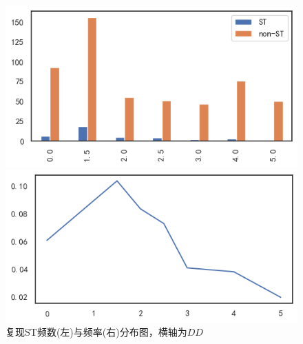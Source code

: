 \documentclass{ctexbeamer}
\begin{document}
\begin{frame}
{\begin{figure}[H]
            \begin{minipage}{0.48\linewidth}
                \includegraphics[width=\linewidth]{img/fig2_.png}
            \end{minipage}
            \begin{minipage}{0.48\linewidth}
                \includegraphics[width=\linewidth]{img/fig3_.png}
            \end{minipage}
            \caption{复现ST频数(左)与频率(右)分布图，横轴为$DD$}\label{fig:23}
        \end{figure}
    }
\end{frame}
\end{document}
